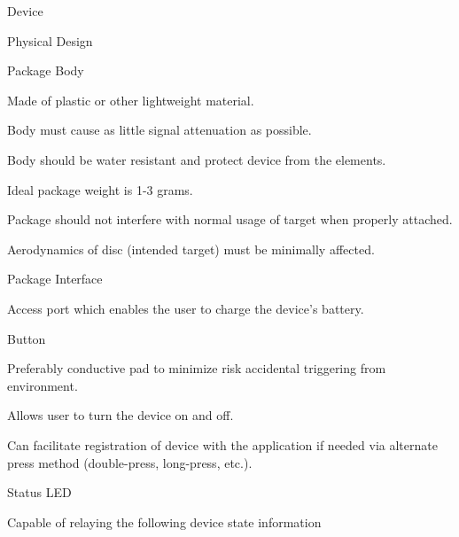 \documentclass[12pt]{article}
\begin{document}
  \begin{packed_enum}
    \item Device
    \begin{packed_enum}
      \item Physical Design
      \begin{packed_enum}
        \item Package Body
        \begin{packed_enum}
          \item Made of plastic or other lightweight material.
          \item Body must cause as little signal attenuation as possible.
          \item Body should be water resistant and protect device from the
                elements.
          \item Ideal package weight is 1-3 grams.
          \item Package should not interfere with normal usage of target when
                properly attached.
          \begin{packed_enum}
            \item Aerodynamics of disc (intended target) must be minimally
                  affected.
          \end{packed_enum}
        \end{packed_enum}
        \item Package Interface
        \begin{packed_enum}
          \item Access port which enables the user to charge the device's
                battery.
          \item Button
          \begin{packed_enum}
            \item Preferably conductive pad to minimize risk accidental
                  triggering from environment.
            \item Allows user to turn the device on and off.
            \item Can facilitate registration of device with the application if
                  needed via alternate press method (double-press, long-press,
                  etc.).
          \end{packed_enum}
          \item Status LED
          \begin{packed_enum}
            \item Capable of relaying the following device state information

\end{packed_enum}
\end{packed_enum}
\end{packed_enum}
\end{packed_enum}
\end{packed_enum}
\end{document}

